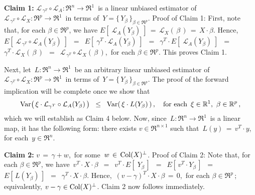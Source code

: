 \vskip 0.5cm
\noindent
\textbf{Claim 1:}\quad
$\mathcal{L}_{\,\gamma^{T}} \circ \mathcal{L}_{A} : \Re^{n} \longrightarrow \Re^{1}$\,
is a linear unbiased estimator of
\,$\mathcal{L}_{\,\gamma^{T}} \circ \mathcal{L}_{X} : \Re^{p} \longrightarrow \Re^{1}$\,
in terms of \,$Y = \{\,Y_{\beta}\,\}_{\beta\in\Re^{p}}$.
\vskip 0.1cm
\noindent
Proof of Claim 1:\quad
First, note that, for each $\beta\in\Re^{p}$, we have
$E\!\left[\; \mathcal{L}_{A}(Y_{\beta})\;\right] \,=\, \mathcal{L}_{X}(\,\beta\,) \,=\, X \cdot \beta$.
Hence,
$E\!\left[\;\mathcal{L}_{\,\gamma^{T}} \circ \mathcal{L}_{A}(Y_{\beta})\;\right]$
\,$=$\, $E\!\left[\;\gamma^{T} \cdot \mathcal{L}_{A}(Y_{\beta})\;\right]$
\,$=$\, $\gamma^{T} \cdot E\!\left[\; \mathcal{L}_{A}(Y_{\beta})\;\right]$
\,$=$\, $\gamma^{T} \cdot \mathcal{L}_{X}(\,\beta\,)$
\,$=$\, $\mathcal{L}_{\,\gamma^{T}} \circ \mathcal{L}_{X}(\,\beta\,)$,\,
for each $\beta\in\Re^{p}$.
This proves Claim 1.

\vskip 0.5cm
\noindent
Next, let
\,$L : \Re^{n} \longrightarrow \Re^{1}$\,
be an arbitrary linear unbiased estimator of
\,$\mathcal{L}_{\,\gamma^{T}} \circ \mathcal{L}_{X} : \Re^{p} \longrightarrow \Re^{1}$\,
in terms of \,$Y = \{\,Y_{\beta}\,\}_{\beta\in\Re^{p}}$.
The proof of the forward implication will be complete once we show that
\begin{equation*}
\textnormal{Var}\!\left(\,\xi\cdot\mathcal{L}_{\gamma^{T}}\circ\mathcal{L}_{A}(Y_{\beta})\,\right)
\;\; \leq \;\;
	\textnormal{Var}\!\left(\,\xi \cdot L(Y_{\beta})\,\right),
\quad
\textnormal{for each \,$\xi \in \mathbb{R}^{1}$, \,$\beta\in\mathbb{R}^{p}$}\,,
\end{equation*}
which we will establish as Claim 4 below.
Now, since \,$L : \Re^{n} \longrightarrow \Re^{1}$\,
is a linear map, it has the following form:
there exists $v \in \Re^{n \times 1}$ such that
\,$L(y) \,=\, v^{T} \cdot y$,\,
for each \,$y \in \Re^{n}$.

\vskip 0.5cm
\noindent
\textbf{Claim 2:}\quad
$v \,=\, \gamma + w$,\, for some \,$w \,\in\, \textnormal{Col}(X)^{\perp}$.
\vskip 0.1cm
\noindent
Proof of Claim 2:\quad
Note that, for each $\beta \in \Re^{p}$, we have
\,$v^{T}\cdot X \cdot \beta$
\,$=$\, $v^{T} \cdot E\!\left[\;Y_{\beta}\,\right]$
\,$=$\, $E\!\left[\,v^{T} \cdot Y_{\beta}\,\right]$
\,$=$\, $E\!\left[\,L(Y_{\beta})\,\right]$
\,$=$\, $\gamma^{T} \cdot X \cdot \beta$.
Hence,
\,$(v - \gamma)^{T} \cdot X \cdot \beta \,=\, 0$,\,
for each $\beta\in\Re^{p}$\,;
equivalently, $v - \gamma \in \textnormal{Col}(X)^{\perp}$.
Claim 2 now follows immediately.


